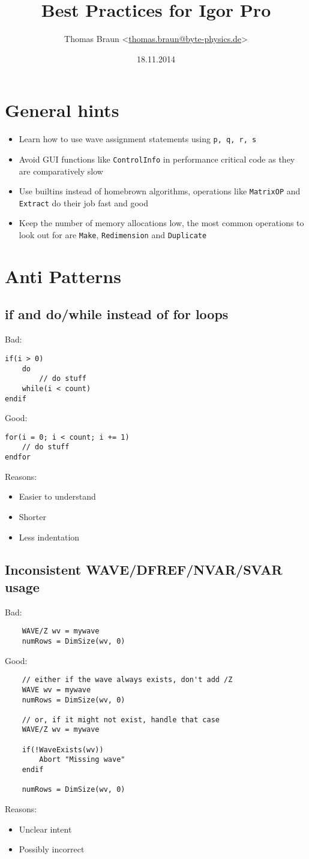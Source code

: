 \documentclass{scrartcl}
\date{18.11.2014}
\author{Thomas Braun <\url{thomas.braun@byte-physics.de}>}
\title{Best Practices for Igor Pro}
\begin{document}
%
\maketitle
%
\section{General hints}
\begin{itemize}
	\item Learn how to use wave assignment statements using \texttt{p, q, r, s}
	\item Avoid GUI functions like \texttt{ControlInfo} in performance critical code as they are comparatively slow
	\item Use builtins instead of homebrown algorithms, operations like \texttt{MatrixOP} and \texttt{Extract} do their job fast and good
	\item Keep the number of memory allocations low, the most common operations to look out for are \texttt{Make}, \texttt{Redimension} and \texttt{Duplicate}
\end{itemize}
%
\section{Anti Patterns}
%
\subsection{if and do/while instead of for loops}
Bad:
\begin{verbatim}
if(i > 0)
	do
		// do stuff
	while(i < count)
endif	
\end{verbatim}
Good:
\begin{verbatim}
for(i = 0; i < count; i += 1)
	// do stuff
endfor
\end{verbatim}
Reasons:
\begin{itemize}
	\item Easier to understand
	\item Shorter
	\item Less indentation
\end{itemize}
%
\subsection{Inconsistent WAVE/DFREF/NVAR/SVAR usage}
Bad:
\begin{verbatim}
	WAVE/Z wv = mywave
	numRows = DimSize(wv, 0)
\end{verbatim}
Good:
\begin{verbatim}
	// either if the wave always exists, don't add /Z
	WAVE wv = mywave
	numRows = DimSize(wv, 0)
	
	// or, if it might not exist, handle that case
	WAVE/Z wv = mywave

	if(!WaveExists(wv))
		Abort "Missing wave"
	endif
	
	numRows = DimSize(wv, 0)
\end{verbatim}
Reasons:
\begin{itemize}
	\item Unclear intent
	\item Possibly incorrect
\end{itemize}
%
\end{document}
